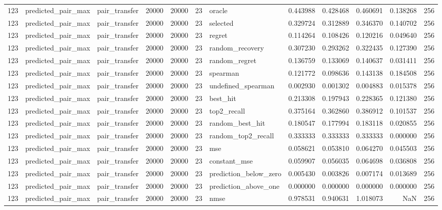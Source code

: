\begin{tabular}{rllrrrlrrrrr}
123 & predicted_pair_max & pair_transfer & 20000 & 20000 & 23 & oracle & 0.443988 & 0.428468 & 0.460691 & 0.138268 & 256 \\
123 & predicted_pair_max & pair_transfer & 20000 & 20000 & 23 & selected & 0.329724 & 0.312889 & 0.346370 & 0.140702 & 256 \\
123 & predicted_pair_max & pair_transfer & 20000 & 20000 & 23 & regret & 0.114264 & 0.108426 & 0.120216 & 0.049640 & 256 \\
123 & predicted_pair_max & pair_transfer & 20000 & 20000 & 23 & random_recovery & 0.307230 & 0.293262 & 0.322435 & 0.127390 & 256 \\
123 & predicted_pair_max & pair_transfer & 20000 & 20000 & 23 & random_regret & 0.136759 & 0.133069 & 0.140637 & 0.031411 & 256 \\
123 & predicted_pair_max & pair_transfer & 20000 & 20000 & 23 & spearman & 0.121772 & 0.098636 & 0.143138 & 0.184508 & 256 \\
123 & predicted_pair_max & pair_transfer & 20000 & 20000 & 23 & undefined_spearman & 0.002930 & 0.001302 & 0.004883 & 0.015378 & 256 \\
123 & predicted_pair_max & pair_transfer & 20000 & 20000 & 23 & best_hit & 0.213308 & 0.197943 & 0.228365 & 0.121380 & 256 \\
123 & predicted_pair_max & pair_transfer & 20000 & 20000 & 23 & top2_recall & 0.375164 & 0.362860 & 0.386912 & 0.101537 & 256 \\
123 & predicted_pair_max & pair_transfer & 20000 & 20000 & 23 & random_best_hit & 0.180547 & 0.177994 & 0.183118 & 0.020855 & 256 \\
123 & predicted_pair_max & pair_transfer & 20000 & 20000 & 23 & random_top2_recall & 0.333333 & 0.333333 & 0.333333 & 0.000000 & 256 \\
123 & predicted_pair_max & pair_transfer & 20000 & 20000 & 23 & mse & 0.058621 & 0.053810 & 0.064270 & 0.045503 & 256 \\
123 & predicted_pair_max & pair_transfer & 20000 & 20000 & 23 & constant_mse & 0.059907 & 0.056035 & 0.064698 & 0.036808 & 256 \\
123 & predicted_pair_max & pair_transfer & 20000 & 20000 & 23 & prediction_below_zero & 0.005430 & 0.003826 & 0.007174 & 0.013689 & 256 \\
123 & predicted_pair_max & pair_transfer & 20000 & 20000 & 23 & prediction_above_one & 0.000000 & 0.000000 & 0.000000 & 0.000000 & 256 \\
123 & predicted_pair_max & pair_transfer & 20000 & 20000 & 23 & nmse & 0.978531 & 0.940631 & 1.018073 & NaN & 256 \\

\end{tabular}
